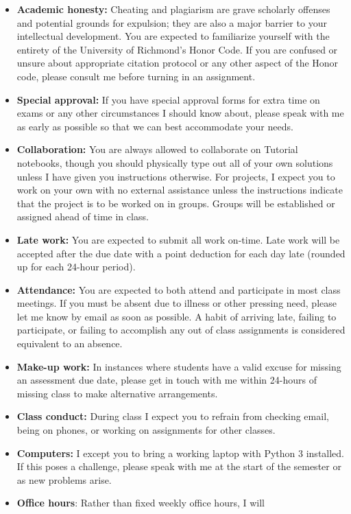 \documentclass[12pt]{article}
\begin{document}
\begin{itemize}\setlength\itemsep{0em}
\item \textbf{Academic honesty:} Cheating and plagiarism are grave scholarly
offenses and potential grounds
for expulsion; they are also a major barrier to your intellectual development.
You are expected to familiarize yourself with the entirety of the
University of Richmond’s Honor Code. If you are confused or unsure about
appropriate citation protocol or any other aspect of the Honor code,
please consult me before turning in an assignment.
\item \textbf{Special approval:} If you have special approval forms for extra
time on exams or any other circumstances I should know about, please speak
with me as early as possible so that we can best accommodate your needs.
\item \textbf{Collaboration:} You are always allowed to collaborate on Tutorial
notebooks, though you should physically type out all of your own solutions
unless I have given you instructions otherwise. For projects, I expect you to
work on your own with no external assistance unless the instructions indicate
that the project is to be worked on in groups. Groups will be established or
assigned ahead of time in class.
\item \textbf{Late work:} You are expected to submit all work on-time. Late
work will be accepted after the due date with a point deduction for each day
late (rounded up for each 24-hour period).
\item \textbf{Attendance:} You are expected to both attend and participate in most
class meetings. If you must be absent due to illness or other pressing
need, please let me know by email as soon as possible. A habit of arriving
late, failing to participate, or failing to accomplish any out of class assignments
is considered equivalent to an absence.
\item \textbf{Make-up work:} In instances where students have a valid excuse for
missing an assessment due date, please get in touch with me within 24-hours of
missing class to make alternative arrangements.
\item \textbf{Class conduct:} During class I expect you to refrain from checking
email, being on phones, or working on assignments for other classes.
\item \textbf{Computers:} I except you to bring a working laptop with Python
3 installed. If this poses a challenge, please speak with me at the
start of the semester or as new problems arise.
\item \textbf{Office hours}: Rather than fixed weekly office hours, I will

\end{itemize}
\end{document}
